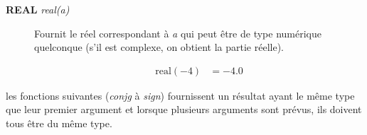 \documentclass[a4paper,twoside]{article}
\begin{document}
\begin{description}
\item[\textbf{REAL} \emph{real(a)}] Fournit le réel correspondant à \emph{a} qui peut être de type numérique quelconque (s'il est complexe, on obtient la partie réelle). 
\begin{exemple}
\begin{align}
\mathrm{real}(-4)  &= -4.0
\end{align}
\end{exemple}

\end{description}

\begin{remarque}
les fonctions suivantes (\emph{conjg} à \emph{sign}) fournissent un résultat ayant le même type que leur premier argument et lorsque plusieurs arguments sont prévus, ils doivent tous être du même type.
\end{remarque}
\end{document}
